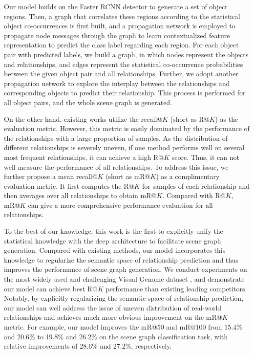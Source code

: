 \documentclass[10pt,twocolumn,letterpaper]{article}
\begin{document}
Our model builds on the Faster RCNN detector \cite{ren2015faster} to generate a set of object regions. Then, a graph that correlates these regions according to the statistical object co-occurrences is first built, and a propagation network is employed to propagate node messages through the graph to learn contextualized feature representation to predict the class label regarding each region. For each object pair with predicted labels, we build a graph, in which nodes represent the objects and relationships, and edges represent the statistical co-occurrence probabilities between the given object pair and all relationships. Further, we adopt another propagation network to explore the interplay between the relationships and corresponding objects to predict their relationship. This process is performed for all object pairs, and the whole scene graph is generated.

On the other hand, existing works utilize the recall@$K$ (short as R@$K$) \cite{lu2016visual} as the evaluation metric. However, this metric is easily dominated by the performance of the relationships with a large proportion of samples. As the distribution of different relationships is severely uneven, if one method performs well on several most frequent relationships, it can achieve a high R@$K$ score. Thus, it can not well measure the performance of all relationships. To address this issue, we further propose a mean recall@$K$ (short as mR@$K$) as a complimentary evaluation metric. It first computes the R@$K$ for samples of each relationship and then averages over all relationships to obtain mR@$K$. Compared with R@$K$, mR@$K$ can give a more comprehensive performance evaluation for all relationships.

To the best of our knowledge, this work is the first to explicitly unify the statistical knowledge with the deep architecture to facilitate scene graph generation. Compared with existing methods, our model incorporates this knowledge to regularize the semantic space of relationship prediction and thus improves the performance of scene graph generation. We conduct experiments on the most widely used and challenging Visual Genome dataset \cite{krishna2017visual}, and demonstrate our model can achieve best R@$K$ performance than existing leading competitors. Notably, by explicitly regularizing the semantic space of relationship prediction, our model can well address the issue of uneven distribution of real-world relationships and achieves much more obvious improvement on the mR@$K$ metric. For example, our model improves the mR@50 and mR@100 from 15.4\% and 20.6\% to 19.8\% and 26.2\% on the scene graph classification task, with relative improvements of 28.6\% and 27.2\%, respectively. 
\end{document}
